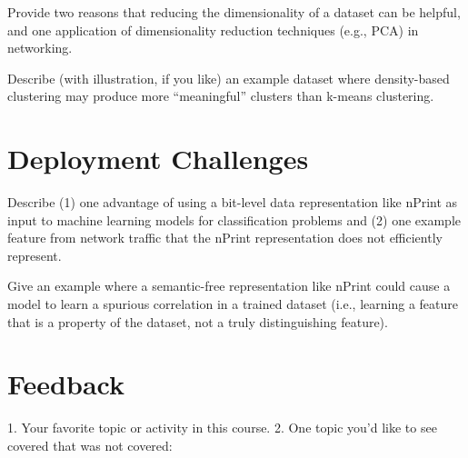 \eprob

Provide two reasons that reducing the dimensionality of a dataset can be
helpful, and one application of dimensionality reduction techniques (e.g.,
PCA) in networking.

\eprob

Describe (with illustration, if you like) an example dataset where
density-based clustering may produce more ``meaningful'' clusters than k-means
clustering.

\eprob


\section*{Deployment Challenges}

Describe (1) one advantage of using a bit-level data representation like
nPrint as input to machine learning models for classification problems and 
(2)
one example feature from network traffic that the nPrint representation does not
efficiently represent.

\eprob

Give an example where a semantic-free representation like nPrint could cause a
model to learn a spurious
correlation in a trained dataset (i.e., learning a feature that is a property
of the dataset, not a truly distinguishing feature).

\eprob


\section*{Feedback}
1. Your favorite topic or activity in this course. 2. One topic you'd like to
see covered that was not covered:

\eprob


